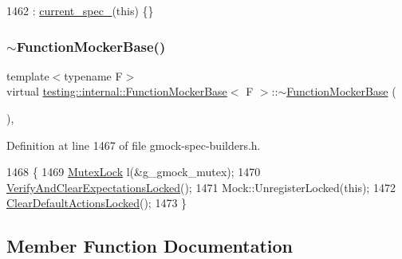 \begin{DoxyCode}
1462 : \hyperlink{classtesting_1_1internal_1_1FunctionMockerBase_af19843831e9f5eb1c79e8923ac42da92}{current\_spec\_}(\textcolor{keyword}{this}) \{\}
\end{DoxyCode}
\mbox{\label{classtesting_1_1internal_1_1FunctionMockerBase_a3c33e7b4aa0e28e5bd46eb072f511068}} 
\subsubsection{\texorpdfstring{$\sim$\+Function\+Mocker\+Base()}{~FunctionMockerBase()}}
{\footnotesize\ttfamily template$<$typename F$>$ \\
virtual \hyperlink{classtesting_1_1internal_1_1FunctionMockerBase}{testing\+::internal\+::\+Function\+Mocker\+Base}$<$ F $>$\+::$\sim$\hyperlink{classtesting_1_1internal_1_1FunctionMockerBase}{Function\+Mocker\+Base} (\begin{DoxyParamCaption}{ }\end{DoxyParamCaption})\hspace{0.3cm}{\ttfamily [inline]}, {\ttfamily [virtual]}}



Definition at line 1467 of file gmock-\/spec-\/builders.\+h.


\begin{DoxyCode}
1468                                             \{
1469     \hyperlink{namespacetesting_1_1internal_a08b187c6cc4e28400aadf9a32fccc8de}{MutexLock} l(&g\_gmock\_mutex);
1470     \hyperlink{classtesting_1_1internal_1_1UntypedFunctionMockerBase_a3f1d62a1662a3daa2895b3af963be269}{VerifyAndClearExpectationsLocked}();
1471     Mock::UnregisterLocked(\textcolor{keyword}{this});
1472     \hyperlink{classtesting_1_1internal_1_1FunctionMockerBase_ada818fcb2b892f21bb939def386599e7}{ClearDefaultActionsLocked}();
1473   \}
\end{DoxyCode}


\subsection{Member Function Documentation}
\mbox{\label{classtesting_1_1internal_1_1FunctionMockerBase_aa2c35c565f08d3649436af443ece468f}} 
